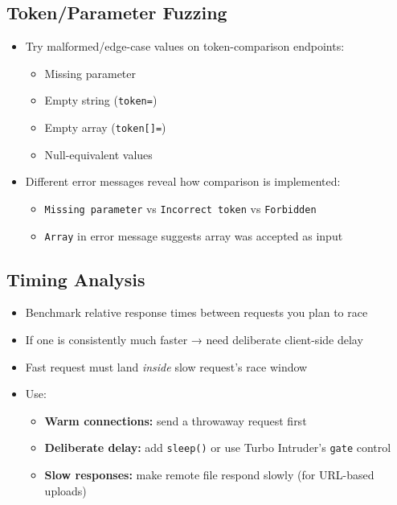\documentclass[11pt]{article}
\begin{document}
\subsection{Token/Parameter Fuzzing}

\begin{checklistbox}
\begin{itemize}
    \item[\checkmark] Try malformed/edge-case values on token-comparison endpoints:
    \begin{itemize}
        \item Missing parameter
        \item Empty string (\texttt{token=})
        \item Empty array (\texttt{token[]=})
        \item Null-equivalent values
    \end{itemize}
    \item[\checkmark] Different error messages reveal how comparison is implemented:
    \begin{itemize}
        \item \texttt{Missing parameter} vs \texttt{Incorrect token} vs \texttt{Forbidden}
        \item \texttt{Array} in error message suggests array was accepted as input
    \end{itemize}
\end{itemize}
\end{checklistbox}

\subsection{Timing Analysis}

\begin{checklistbox}
\begin{itemize}
    \item[\checkmark] Benchmark relative response times between requests you plan to race
    \item[\checkmark] If one is consistently much faster → need deliberate client-side delay
    \item[\checkmark] Fast request must land \emph{inside} slow request's race window
    \item[\checkmark] Use:
    \begin{itemize}
        \item \textbf{Warm connections:} send a throwaway request first
        \item \textbf{Deliberate delay:} add \texttt{sleep()} or use Turbo Intruder's \texttt{gate} control
        \item \textbf{Slow responses:} make remote file respond slowly (for URL-based uploads)
    \end{itemize}
\end{itemize}
\end{checklistbox}
\end{document}
